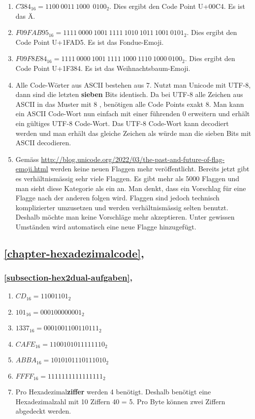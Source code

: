 \begin{enumerate}
\item $C384_{16} = 1100~0011~1000~~0100_2$. Dies ergibt den Code Point U+00C4. Es ist das Ä.
\item $F09FAB95_{16} = 1111~0000~1001~1111~1010~1011~1001~0101_2$. Dies ergibt den Code Point U+1FAD5. Es ist das Fondue-Emoji.
\item $F09F8E84_{16} = 1111~0000~1001~1111~1000~1110~1000~0100_2$. Dies ergibt den Code Point U+1F384. Es ist das Weihnachtsbaum-Emoji.
\item Alle Code-Wörter aus \ac{ASCII} bestehen aus \qty{7}{\bit}. Nutzt man Unicode mit UTF-8, dann sind die letzten \textbf{sieben} Bits identisch. Da bei UTF-8 alle Zeichen aus \ac{ASCII} in das Muster mit \qty{8}{\bit} , benötigen alle Code Points exakt \qty{8}{\bit}. Man kann ein \ac{ASCII} Code-Wort nun einfach mit einer führenden \num{0} erweitern und erhält ein gültiges UTF-8 Code-Wort. Das UTF-8 Code-Wort kann decodiert werden und man erhält das gleiche Zeichen als würde man die sieben Bits mit \ac{ASCII} decodieren.
\item Gemäss \url{http://blog.unicode.org/2022/03/the-past-and-future-of-flag-emoji.html} werden keine neuen Flaggen mehr veröffentlicht. Bereits jetzt gibt es verhältnismässig sehr viele Flaggen. Es gibt mehr als \num{5000} Flaggen und man sieht diese Kategorie als ein  an. Man denkt, dass ein Vorschlag für eine Flagge nach der anderen folgen wird. Flaggen sind jedoch technisch komplizierter umzusetzen und werden verhältnismässig selten benutzt. Deshalb möchte man keine Vorschläge mehr akzeptieren. Unter gewissen Umständen wird automatisch eine neue Flagge hinzugefügt.
\end{enumerate}

\subsection{\autoref{chapter-hexadezimalcode}, }

\subsubsection{\autoref{subsection-hex2dual-aufgaben}, }

\begin{enumerate}
\item $CD_{16} = 11001101_2$
\item $101_{16} = 000100000001_2$
\item $1337_{16} = 0001001100110111_2$
\item $CAFE_{16} = 1100101011111110_2$
\item $ABBA_{16} = 1010101110111010_2$
\item $FFFF_{16} = 1111111111111111_2$
\item Pro Hexadezimal\textbf{ziffer} werden \qty{4}{\bit} benötigt. Deshalb benötigt eine Hexadezimalzahl mit \num{10} Ziffern \qty{40}{\bit} = \qty{5}{\byte}. Pro Byte können zwei Ziffern abgedeckt werden.
\end{enumerate}

